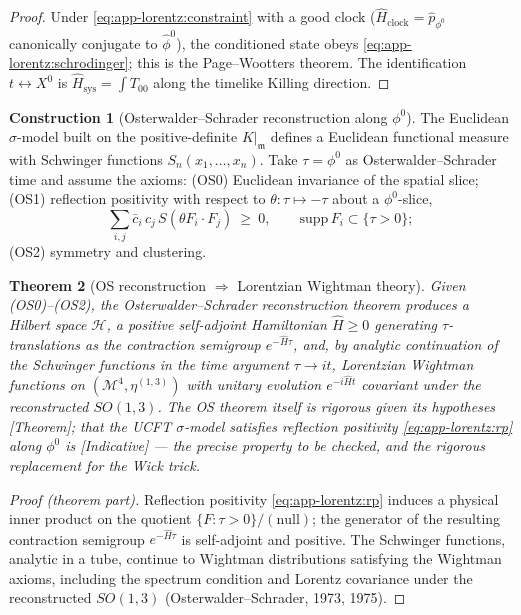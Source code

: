 \documentclass[11pt]{article}
\theoremstyle{plain}
\newtheorem{theorem}{Theorem}[section]
\theoremstyle{definition}
\newtheorem{construction}[theorem]{Construction}
\theoremstyle{remark}
\begin{document}
\begin{proof}
Under \eqref{eq:app-lorentz:constraint} with a good clock
($\hat{H}_{\mathrm{clock}}=\hat{p}_{\phi^{0}}$ canonically conjugate to
$\hat{\phi}^{0}$), the conditioned state obeys \eqref{eq:app-lorentz:schrodinger};
this is the Page--Wootters theorem. The identification $t\leftrightarrow X^{0}$ is
$\hat{H}_{\mathrm{sys}}=\int T_{00}$ along the timelike Killing direction.
\end{proof}

\begin{construction}[Osterwalder--Schrader reconstruction along \texorpdfstring{$\phi^{0}$}{phi0}]
\label{con:app-lorentz:OS}
The Euclidean $\sigma$-model built on the positive-definite $K|_{\mathfrak{m}}$
defines a Euclidean functional measure with Schwinger functions
$S_{n}(x_{1},\dots,x_{n})$. Take $\tau=\phi^{0}$ as Osterwalder--Schrader time and
assume the axioms: (OS0) Euclidean invariance of the spatial slice; (OS1) reflection
positivity with respect to $\theta:\tau\mapsto-\tau$ about a $\phi^{0}$-slice,
\begin{equation}
\label{eq:app-lorentz:rp}
\sum_{i,j}\bar{c}_{i}\,c_{j}\,S\!\left(\theta F_{i}\cdot F_{j}\right)\ \ge\ 0,
\qquad \mathrm{supp}\,F_{i}\subset\{\tau>0\};
\end{equation}
(OS2) symmetry and clustering.
\end{construction}

\begin{theorem}[OS reconstruction \texorpdfstring{$\Rightarrow$}{=>} Lorentzian Wightman theory]
\label{thm:app-lorentz:OS}
Given (OS0)--(OS2), the Osterwalder--Schrader reconstruction theorem produces a
Hilbert space $\mathcal{H}$, a positive self-adjoint Hamiltonian $\hat{H}\ge0$
generating $\tau$-translations as the contraction semigroup $e^{-\hat{H}\tau}$, and,
by analytic continuation of the Schwinger functions in the time argument
$\tau\to it$, Lorentzian Wightman functions on $(\mathcal{M}^{4},\eta^{(1,3)})$ with
unitary evolution $e^{-i\hat{H}t}$ covariant under the reconstructed $SO(1,3)$. The
OS theorem itself is rigorous given its hypotheses \emph{[Theorem]}; that the UCFT
$\sigma$-model \emph{satisfies} reflection positivity \eqref{eq:app-lorentz:rp} along
$\phi^{0}$ is \emph{[Indicative]} --- the precise property to be checked, and the
rigorous replacement for the Wick trick.
\end{theorem}

\begin{proof}[Proof (theorem part)]
Reflection positivity \eqref{eq:app-lorentz:rp} induces a physical inner product on
the quotient $\{F:\tau>0\}/(\text{null})$; the generator of the resulting contraction
semigroup $e^{-\hat{H}\tau}$ is self-adjoint and positive. The Schwinger functions,
analytic in a tube, continue to Wightman distributions satisfying the Wightman axioms,
including the spectrum condition and Lorentz covariance under the reconstructed
$SO(1,3)$ (Osterwalder--Schrader, 1973, 1975).
\end{proof}
\end{document}
